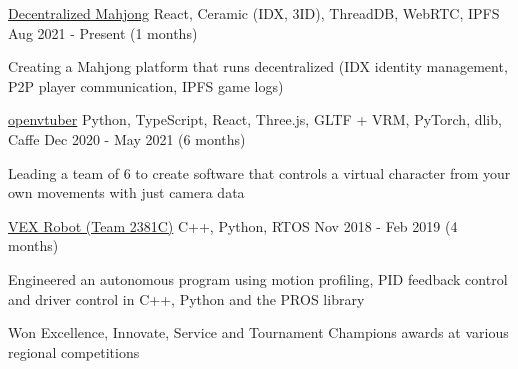 \begin{cventries}
	\cventry
	{\href{https://github.com/fensandemajiang/fensandemajiang}{Decentralized Mahjong}}
	{React, Ceramic (IDX, 3ID), ThreadDB, WebRTC, IPFS}
	{}
	{Aug 2021 - Present  (1 months)}
	{
		\begin{cvitems}
			\item{Creating a Mahjong platform that runs decentralized (IDX identity management, P2P player communication, IPFS game logs)}
		\end{cvitems}
	}
	\cventry
	{\href{https://github.com/virtuber/openvtuber}{openvtuber}}
	{Python, TypeScript, React, Three.js, GLTF + VRM, PyTorch, dlib, Caffe}
	{}
	{Dec 2020 - May 2021 (6 months)}
	{
		\begin{cvitems}
			\item{Leading a team of 6 to create software that controls a virtual character from your own movements with just camera data}
		\end{cvitems}
	}
	\cventry
	{\href{https://gitlab.com/2381-robotics/2381C-V2}{VEX Robot (Team 2381C)}}
	{C++, Python, RTOS}
	{}
	{Nov 2018 - Feb 2019 (4 months)}
	{
		\begin{cvitems}
			\item{Engineered an autonomous program using motion profiling, PID feedback control and driver control in C++, Python and the PROS library}
			\item{Won Excellence, Innovate, Service and Tournament Champions awards at various regional competitions}
		\end{cvitems}
	}
\end{cventries}
